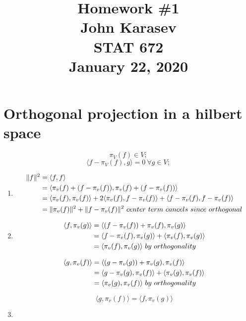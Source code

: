 \documentclass{article}
\title{Homework \#1\\ 
    \vspace{0.5cm}
    \normalsize John Karasev\\
    \vspace{0.2cm}
    \normalsize STAT 672\\
    \vspace{0.2cm}
    January 22, 2020 }
\date{}
\begin{document}
\maketitle

\section{Orthogonal projection in a hilbert space}
\[\pi_V(f) \in V;\]
\[\langle f - \pi_V(f), g \rangle =0 \ \forall g \in V; \]
\begin{enumerate}
    \item   
        \begin{equation}
        \begin{aligned}
        \|f\|^2 &= \langle f, f \rangle \\
        & = \langle \pi_v(f) + (f - \pi_v(f)), \pi_v(f) + (f - \pi_v(f)) \rangle  \notag \\
        & = \langle \pi_v(f), \pi_v(f) \rangle + 2\langle \pi_v(f), f - \pi_v(f) \rangle + \langle f - \pi_v(f), f - \pi_v(f) \rangle \notag \\
        & = \|\pi_v(f)\|^2 + \|f - \pi_v(f)\|^2\ center\ term\ cancels\ since\ orthogonal 
        \end{aligned}
        \end{equation}
    \item 
        \begin{equation}
        \begin{aligned}
        \langle f, \pi_v(g) \rangle &= \langle (f-\pi_v(f)) + \pi_v(f), \pi_v(g) \rangle \\
        & = \langle f-\pi_v(f) , \pi_v(g) \rangle +  \langle \pi_v(f) , \pi_v(g) \rangle \notag \\
        & = \langle \pi_v(f) , \pi_v(g) \rangle\ by\ orthogonality
        \end{aligned}
        \end{equation} 
        
        \begin{equation}
        \begin{aligned}
        \langle g, \pi_v(f) \rangle &= \langle (g-\pi_v(g)) + \pi_v(g), \pi_v(f) \rangle \\
        & = \langle g-\pi_v(g), \pi_v(f) \rangle +  \langle \pi_v(g) , \pi_v(f) \rangle \notag \\
        & = \langle \pi_v(g) , \pi_v(f) \rangle\ by\ orthogonality
        \end{aligned}
        \end{equation}

        \[ \langle g, \pi_v(f) \rangle = \langle f, \pi_v(g) \rangle\]
    \item 
\end{enumerate}
\end{document}
